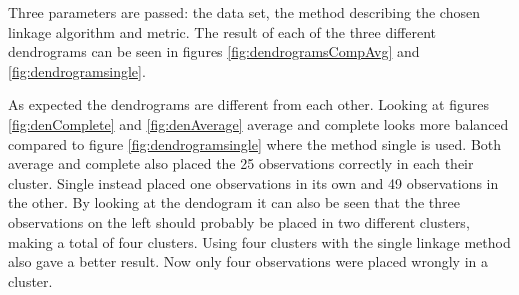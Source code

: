 Three parameters are passed: the data set, the method describing the chosen linkage algorithm and metric. The result of each of the three different dendrograms can be seen in figures \ref{fig:dendrogramsCompAvg} and \ref{fig:dendrogramsingle}.







As expected the dendrograms are different from each other.
Looking at figures \ref{fig:denComplete} and \ref{fig:denAverage} average and complete looks more balanced compared to figure \ref{fig:dendrogramsingle} where the method single is used. Both average and complete also placed the 25 observations correctly in each their cluster. Single instead placed one observations in its own and 49 observations in the other. By looking at the dendogram it can also be seen that the three observations on the left should probably be placed in two different clusters, making a total of four clusters. Using four clusters with the single linkage method also gave a better result. Now only four observations were placed wrongly in a cluster.